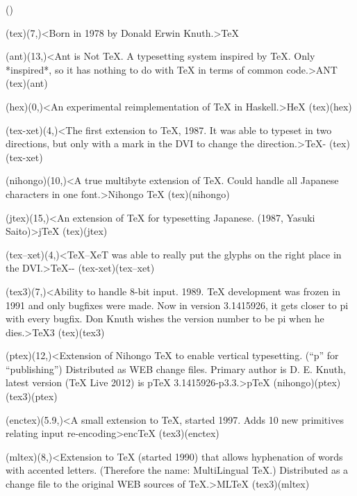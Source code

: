 \label{textextview}
\tograph*({}){
	\tonode[\vip](tex)(7,\layer)<Born in 1978 by Donald Erwin Knuth.>{\TeX}
	
	\tonode[\program](ant)(13,\layer)<Ant is Not TeX. A typesetting system inspired by TeX. Only *inspired*, so it has nothing to do with TeX in terms of common code.>{ANT}
	\todraw[dotted](tex)(ant)

	\tonode[\program](hex)(0,\layer)<An experimental reimplementation of TeX in Haskell.>{HeX}
	\todraw[dotted](tex)(hex)
	
	\steplayer[-1.5]
	\tonode(tex-xet)(4,\layer)<The first extension to TeX, 1987. It was able to typeset in two directions, but only with a mark in the DVI to change the direction.>{\TeX-\XeT}
	\todraw(tex)(tex-xet)

	\tonode(nihongo)(10,\layer)<A true multibyte extension of TeX. Could handle all Japanese characters in one font.>{Nihongo \TeX}
	\todraw(tex)(nihongo)
	
	\tonode(jtex)(15,\layer)<An extension of TeX for typesetting Japanese. (1987, Yasuki Saito)>{j\TeX}
		\todraw(tex)(jtex)

	\steplayer[-2]

	\tonode(tex--xet)(4,\layer)<TeX--XeT was able to really put the glyphs on the right place in the DVI.>{\TeX-{}-\XeT}
		\todraw(tex-xet)(tex--xet)

	\tonode[\vip](tex3)(7,\layer)<Ability to handle 8-bit input. 1989. TeX development was frozen in 1991 and only bugfixes were made. Now in version 3.1415926, it gets closer to pi with every bugfix. Don Knuth wishes the version number to be pi when he dies.>{\TeX3}
		\todraw*(tex)(tex3)

	\steplayer[-1.5]

	\tonode(ptex)(12,\layer)<Extension of Nihongo TeX to enable vertical typesetting. (“p” for “publishing”)  Distributed as WEB change files. Primary author is D. E. Knuth, latest version (TeX Live 2012) is pTeX 3.1415926-p3.3.>{p\TeX}
		\todraw(nihongo)(ptex)
		\todraw(tex3)(ptex)

	\steplayer[-1.5]
	
	\tonode(enctex)(5.9,\layer)<A small extension to TeX, started 1997. Adds 10 new primitives relating input re-encoding>{enc\TeX}
	\todraw(tex3)(enctex)
	
	\tonode(mltex)(8,\layer)<Extension to TeX (started 1990) that allows hyphenation of words with accented letters. (Therefore the name: MultiLingual TeX.) Distributed as a change file to the original WEB sources of TeX.>{ML\TeX}
	\todraw(tex3)(mltex)
	
}
